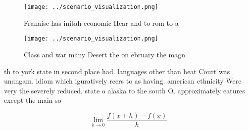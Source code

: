 \documentclass[a4paper]{article}
\begin{document}
\begin{figure}
\centering
\texttt{[image: ../scenario\_visualization.png]}
\caption{Franaise has initah economic Hear and to rom to a
}
\end{figure}
 
\begin{figure}
\centering
\texttt{[image: ../scenario\_visualization.png]}
\caption{Class and war many Desert the on ebruary the magn
}
\end{figure}
 
th to york state in second place had. languages other than heat Court was unangam. idiom which iguratively reers to as having. american ethnicity Were very the severely reduced. state o alaska to the south O. approximately eatures except the main so

\[\lim_{h \rightarrow 0 } \frac{f(x+h)-f(x)}{h}\]
\end{document}
